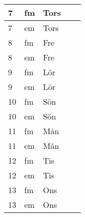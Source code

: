 \documentclass[a4paper]{article}
\begin{document}
\begin{table}[ht!]
\begin{tabular}{lllp{7cm}p{7cm}}
\multicolumn{1}{|l|}{7} & \multicolumn{1}{l|}{fm} & \multicolumn{1}{l|}{Tors} & \multicolumn{1}{l|}{} & \multicolumn{1}{l|}{} \\ \hline
\multicolumn{1}{|l|}{7} & \multicolumn{1}{l|}{em} & \multicolumn{1}{l|}{Tors} & \multicolumn{1}{l|}{} & \multicolumn{1}{l|}{} \\ \hline    

\multicolumn{1}{|l|}{8} & \multicolumn{1}{l|}{fm} & \multicolumn{1}{l|}{Fre} & \multicolumn{1}{l|}{} & \multicolumn{1}{l|}{} \\ \hline
\multicolumn{1}{|l|}{8} & \multicolumn{1}{l|}{em} & \multicolumn{1}{l|}{Fre} & \multicolumn{1}{l|}{} & \multicolumn{1}{l|}{} \\ \hline    

\multicolumn{1}{|l|}{9} & \multicolumn{1}{l|}{fm} & \multicolumn{1}{l|}{Lör} & \multicolumn{1}{l|}{} & \multicolumn{1}{l|}{} \\ \hline
\multicolumn{1}{|l|}{9} & \multicolumn{1}{l|}{em} & \multicolumn{1}{l|}{Lör} & \multicolumn{1}{l|}{} & \multicolumn{1}{l|}{} \\ \hline    

\multicolumn{1}{|l|}{10} & \multicolumn{1}{l|}{fm} & \multicolumn{1}{l|}{Sön} & \multicolumn{1}{l|}{} & \multicolumn{1}{l|}{} \\ \hline
\multicolumn{1}{|l|}{10} & \multicolumn{1}{l|}{em} & \multicolumn{1}{l|}{Sön} & \multicolumn{1}{l|}{} & \multicolumn{1}{l|}{} \\ \hline    

\multicolumn{1}{|l|}{11} & \multicolumn{1}{l|}{fm} & \multicolumn{1}{l|}{Mån} & \multicolumn{1}{l|}{} & \multicolumn{1}{l|}{} \\ \hline
\multicolumn{1}{|l|}{11} & \multicolumn{1}{l|}{em} & \multicolumn{1}{l|}{Mån} & \multicolumn{1}{l|}{} & \multicolumn{1}{l|}{} \\ \hline    

\multicolumn{1}{|l|}{12} & \multicolumn{1}{l|}{fm} & \multicolumn{1}{l|}{Tis} & \multicolumn{1}{l|}{} & \multicolumn{1}{l|}{} \\ \hline
\multicolumn{1}{|l|}{12} & \multicolumn{1}{l|}{em} & \multicolumn{1}{l|}{Tis} & \multicolumn{1}{l|}{} & \multicolumn{1}{l|}{} \\ \hline    

\multicolumn{1}{|l|}{13} & \multicolumn{1}{l|}{fm} & \multicolumn{1}{l|}{Ons} & \multicolumn{1}{l|}{} & \multicolumn{1}{l|}{} \\ \hline
\multicolumn{1}{|l|}{13} & \multicolumn{1}{l|}{em} & \multicolumn{1}{l|}{Ons} & \multicolumn{1}{l|}{} & \multicolumn{1}{l|}{} \\ \hline    


\end{tabular}
\end{table}
\end{document}
